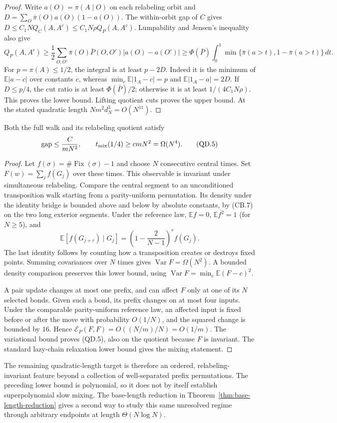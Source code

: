 \begin{proof}
Write $a(O)=\pi(A\mid O)$ on each relabeling orbit and
$D=\sum_O\bar\pi(O)a(O)(1-a(O))$.  The within-orbit gap of $C$ gives
$D\le C_1NQ_C(A,A^c)\le C_1N\rho Q_P(A,A^c)$.
Lumpability and Jensen's inequality also give
\[
 Q_P(A,A^c)\ge\frac12\sum_{O,O'}\bar\pi(O)\bar P(O,O')
                    |a(O)-a(O')|
 \ge\Phi(\bar P)\int_0^1\min\{\bar\pi(a>t),1-\bar\pi(a>t)\}\,dt.
\]
For $p=\pi(A)\le1/2$, the integral is at least $p-2D$.
Indeed it is the minimum of $\mathbb E|a-c|$ over constants $c$,
whereas $\min_c\mathbb E|1_A-c|=p$ and
$\mathbb E|1_A-a|=2D$.  If $D\le p/4$, the cut ratio is at least
$\Phi(\bar P)/2$; otherwise it is at least $1/(4C_1N\rho)$.
This proves the lower bound.  Lifting quotient cuts proves the upper
bound.  At the stated quadratic length $Nm^2d_N^3=O(N^{11})$.
\end{proof}

\begin{proposition}
\label{prop:quadratic-slow-mode}
Both the full walk and its relabeling quotient satisfy
\[
 \operatorname{gap}\le\frac{C}{mN^2},\qquad
 t_{\rm mix}(1/4)\ge c mN^2=\Omega(N^4).            \tag{QD.5}
\]
\end{proposition}
\begin{proof}
Let $f(\sigma)=\#\operatorname{Fix}(\sigma)-1$ and choose $N$ consecutive
central times.  Set $F(w)=\sum_j f(G_j)$ over these times.  This observable
is invariant under simultaneous relabeling.  Compare the central segment
to an unconditioned transposition walk starting from a parity-uniform
permutation.  Its density under the identity bridge is bounded above
and below by absolute constants, by (CB.7) on the two long exterior
segments.  Under the reference law, $\mathbb E f=0$,
$\mathbb E f^2=1$ (for $N\ge5$), and
\[
 \mathbb E[f(G_{j+r})\mid G_j]
       =\left(1-\frac2{N-1}\right)^r f(G_j).
\]
The last identity follows by counting how a transposition creates or
destroys fixed points.  Summing covariances over $N$ times gives
$\operatorname{Var}F=\Omega(N^2)$.  A bounded density comparison
preserves this lower bound, using $\operatorname{Var}F=\min_c\mathbb E(F-c)^2$.

A pair update changes at most one prefix, and can affect $F$ only at
one of its $N$ selected bonds.  Given such a bond, its prefix changes
on at most four inputs.  Under the comparable parity-uniform reference
law, an affected input is fixed before or after the move with
probability $O(1/N)$, and the squared change is bounded by $16$.
Hence $\mathcal E_P(F,F)=O((N/m)/N)=O(1/m)$.
The variational bound proves (QD.5), also on the quotient because $F$
is invariant.  The standard lazy-chain relaxation lower bound gives
the mixing statement.
\end{proof}

The remaining quadratic-length target is therefore an ordered,
relabeling-invariant feature beyond a collection of well-separated
prefix permutations.  The preceding lower bound is polynomial, so it
does not by itself establish superpolynomial slow mixing.  The
base-length reduction in Theorem~\ref{thm:base-length-reduction} gives
a second way to study this same unresolved regime through arbitrary
endpoints at length $\Theta(N\log N)$.
